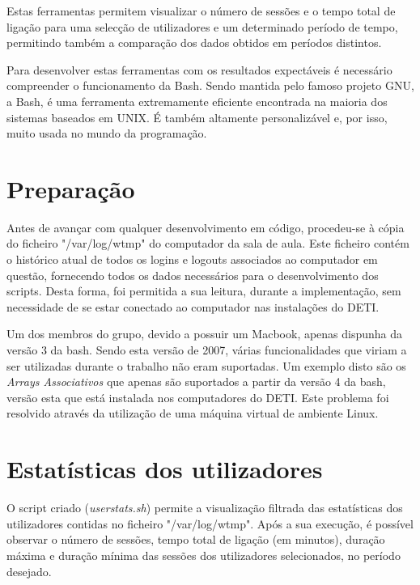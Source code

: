 \documentclass[10pt,portuguese]{article}
\begin{document}
\par Estas ferramentas permitem visualizar o número de sessões e o tempo total de ligação para uma selecção de utilizadores e um determinado período de tempo, permitindo também a comparação dos dados obtidos em períodos distintos.

\par Para desenvolver estas ferramentas com os resultados expectáveis é necessário compreender o funcionamento da Bash. Sendo mantida pelo famoso projeto GNU, a Bash, é uma ferramenta extremamente eficiente encontrada na maioria dos sistemas baseados em UNIX. É também altamente personalizável e, por isso, muito usada no mundo da programação.
 

\clearpage

\section{Preparação}
\par Antes de avançar com qualquer desenvolvimento em código, procedeu-se à cópia do ficheiro "/var/log/wtmp" do computador da sala de aula. Este ficheiro contém o histórico atual de todos os logins e logouts associados ao computador em questão, fornecendo todos os dados necessários para o desenvolvimento dos scripts. Desta forma, foi permitida a sua leitura, durante a implementação, sem necessidade de se estar conectado ao computador nas instalações do DETI.
\par Um dos membros do grupo, devido a possuir um Macbook, apenas dispunha da versão 3 da bash. Sendo esta versão de 2007, várias funcionalidades que viriam a ser utilizadas durante o trabalho não eram suportadas. Um exemplo disto são os \textit{Arrays Associativos} que apenas são suportados a partir da versão 4 da bash, versão esta que está instalada nos computadores do DETI. Este problema foi resolvido através da utilização de uma máquina virtual de ambiente Linux.


\clearpage

\section{Estatísticas dos utilizadores}
O script criado (\textit{userstats.sh}) permite a visualização filtrada das estatísticas dos utilizadores contidas no ficheiro "/var/log/wtmp". Após a sua execução, é possível observar o número de sessões, tempo total de ligação (em minutos), duração máxima e duração mínima das sessões dos utilizadores selecionados, no período desejado.
\end{document}

